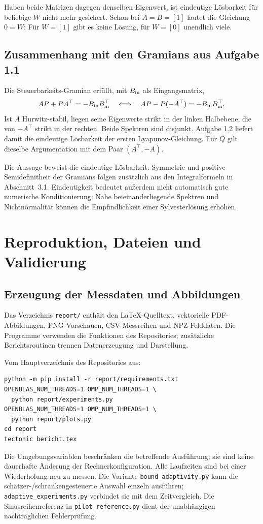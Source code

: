 \documentclass[11pt,a4paper]{article}
\begin{document}
Haben beide Matrizen dagegen denselben Eigenwert, ist eindeutige Lösbarkeit für beliebige $W$ nicht mehr gesichert. Schon bei $A=B=[1]$ lautet die Gleichung $0=W$: Für $W=[1]$ gibt es keine Lösung, für $W=[0]$ unendlich viele.

\subsection{Zusammenhang mit den Gramians aus Aufgabe 1.1}
Die Steuerbarkeits-Gramian erfüllt, mit $B_{\rm in}$ als Eingangsmatrix,
\begin{equation}
 AP+PA^\top=-B_{\rm in}B_{\rm in}^\top
 \quad\Longleftrightarrow\quad
 AP-P(-A^\top)=-B_{\rm in}B_{\rm in}^\top.
\end{equation}
Ist $A$ Hurwitz-stabil, liegen seine Eigenwerte strikt in der linken Halbebene, die von $-A^\top$ strikt in der rechten. Beide Spektren sind disjunkt. Aufgabe 1.2 liefert damit die eindeutige Lösbarkeit der ersten Lyapunov-Gleichung. Für $Q$ gilt dieselbe Argumentation mit dem Paar $(A^\top,-A)$.

Die Aussage beweist die eindeutige Lösbarkeit. Symmetrie und positive Semidefinitheit der Gramians folgen zusätzlich aus den Integralformeln in Abschnitt~3.1. Eindeutigkeit bedeutet außerdem nicht automatisch gute numerische Konditionierung: Nahe beieinanderliegende Spektren und Nichtnormalität können die Empfindlichkeit einer Sylvesterlösung erhöhen.


\clearpage

\section{Reproduktion, Dateien und Validierung}
\subsection{Erzeugung der Messdaten und Abbildungen}
Das Verzeichnis \texttt{report/} enthält den LaTeX-Quelltext, vektorielle PDF-Abbildungen, PNG-Vorschauen, CSV-Messreihen und NPZ-Felddaten. Die Programme verwenden die Funktionen des Repositories; zusätzliche Berichtsroutinen trennen Datenerzeugung und Darstellung.

Vom Hauptverzeichnis des Repositories aus:
\begin{verbatim}
python -m pip install -r report/requirements.txt
OPENBLAS_NUM_THREADS=1 OMP_NUM_THREADS=1 \
  python report/experiments.py
OPENBLAS_NUM_THREADS=1 OMP_NUM_THREADS=1 \
  python report/plots.py
cd report
tectonic bericht.tex
\end{verbatim}
Die Umgebungsvariablen beschränken die betreffende Ausführung; sie sind keine dauerhafte Änderung der Rechnerkonfiguration. Alle Laufzeiten sind bei einer Wiederholung neu zu messen. Die Variante \texttt{bound\_adaptivity.py} kann die schätzer-/schrankengesteuerte Auswahl einzeln ausführen; \texttt{adaptive\_experiments.py} verbindet sie mit dem Zeitvergleich. Die Sinusreihenreferenz in \texttt{pilot\_reference.py} dient der unabhängigen nachträglichen Fehlerprüfung.
\end{document}
